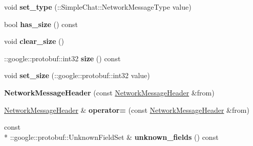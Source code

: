 \begin{DoxyCompactItemize}
\item 
\hypertarget{classSimpleChat_1_1NetworkMessageHeader_a05389e5df449611dc1396b530cdb5f94}{void {\bfseries set\-\_\-type} (\-::Simple\-Chat\-::\-Network\-Message\-Type value)}\label{classSimpleChat_1_1NetworkMessageHeader_a05389e5df449611dc1396b530cdb5f94}

\item 
\hypertarget{classSimpleChat_1_1NetworkMessageHeader_a2464b223558059d6c278dc52286fc77a}{bool {\bfseries has\-\_\-size} () const }\label{classSimpleChat_1_1NetworkMessageHeader_a2464b223558059d6c278dc52286fc77a}

\item 
\hypertarget{classSimpleChat_1_1NetworkMessageHeader_a5fa0c823592084a7d356d5a473395109}{void {\bfseries clear\-\_\-size} ()}\label{classSimpleChat_1_1NetworkMessageHeader_a5fa0c823592084a7d356d5a473395109}

\item 
\hypertarget{classSimpleChat_1_1NetworkMessageHeader_a4d2c42bd336f021b6d87a3239fd9cabd}{\-::google\-::protobuf\-::int32 {\bfseries size} () const }\label{classSimpleChat_1_1NetworkMessageHeader_a4d2c42bd336f021b6d87a3239fd9cabd}

\item 
\hypertarget{classSimpleChat_1_1NetworkMessageHeader_a8a0c7559de32b473e6a92160973f406c}{void {\bfseries set\-\_\-size} (\-::google\-::protobuf\-::int32 value)}\label{classSimpleChat_1_1NetworkMessageHeader_a8a0c7559de32b473e6a92160973f406c}

\item 
\hypertarget{classSimpleChat_1_1NetworkMessageHeader_a1d1af8dfcf0c03757ac9caf3d164b0e8}{{\bfseries Network\-Message\-Header} (const \hyperlink{classSimpleChat_1_1NetworkMessageHeader}{Network\-Message\-Header} \&from)}\label{classSimpleChat_1_1NetworkMessageHeader_a1d1af8dfcf0c03757ac9caf3d164b0e8}

\item 
\hypertarget{classSimpleChat_1_1NetworkMessageHeader_a2e9fe30dac33dfac80ac154ddcd0914a}{\hyperlink{classSimpleChat_1_1NetworkMessageHeader}{Network\-Message\-Header} \& {\bfseries operator=} (const \hyperlink{classSimpleChat_1_1NetworkMessageHeader}{Network\-Message\-Header} \&from)}\label{classSimpleChat_1_1NetworkMessageHeader_a2e9fe30dac33dfac80ac154ddcd0914a}

\item 
\hypertarget{classSimpleChat_1_1NetworkMessageHeader_a0d7814ba533eae44c26f024d84103e94}{const \\*
\-::google\-::protobuf\-::\-Unknown\-Field\-Set \& {\bfseries unknown\-\_\-fields} () const }\label{classSimpleChat_1_1NetworkMessageHeader_a0d7814ba533eae44c26f024d84103e94}


\end{DoxyCompactItemize}
